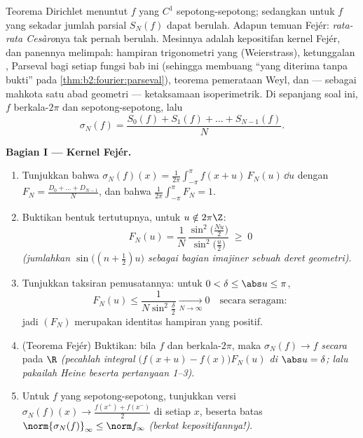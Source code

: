\begin{problem}\label{pb:b2:fourier:1}
Teorema Dirichlet menuntut $f$ yang $C^1$ sepotong-sepotong; sedangkan untuk $f$
yang sekadar  jumlah parsial $S_N(f)$ dapat berulah. Adapun temuan
Fejér: \emph{rata-rata Cesàro}nya tak pernah berulah. Mesinnya adalah
kepositifan kernel Fejér, dan panennya
melimpah: hampiran trigonometri yang  (Weierstrass),
ketunggalan , Parseval bagi setiap fungsi
bab ini (sehingga membuang ``yang diterima tanpa bukti'' pada
\cref{thm:b2:fourier:parseval}), teorema pemerataan Weyl,
dan --- sebagai mahkota satu abad geometri --- 
ketaksamaan isoperimetrik.
Di sepanjang soal ini, $f$ berkala-$2\pi$ dan  sepotong-sepotong,
lalu
\[
\sigma_N(f) = \frac{S_0(f) + S_1(f) + \dots +
S_{N-1}(f)}{N} .
\]

\medskip
\noindent\textbf{Bagian I --- Kernel Fejér.}
\begin{enumerate}
  \item Tunjukkan bahwa $\sigma_N(f)(x) =
        \frac{1}{2\pi}\int_{-\pi}^{\pi}f(x+u)\,F_N(u)\,\dd u$
        dengan $F_N = \frac{D_0 + \dots + D_{N-1}}{N}$, dan
        bahwa $\frac{1}{2\pi}\int_{-\pi}^{\pi}F_N = 1$.
  \item Buktikan bentuk tertutupnya, untuk $u \notin 2\pi\Z$:
        \[
        F_N(u) = \frac{1}{N}\,
        \frac{\sin^2\bigl(\frac{Nu}{2}\bigr)}
        {\sin^2\bigl(\frac u2\bigr)} \;\geq\; 0
        \]
        \emph{(jumlahkan $\sin\bigl((n+\frac12)u\bigr)$ sebagai
        bagian imajiner sebuah deret geometri)}.
  \item Tunjukkan taksiran pemusatannya: untuk $0 < \delta \leq
        \abs u \leq \pi$,
        \[
        F_N(u) \leq \frac{1}{N\sin^2\frac\delta2}
        \xrightarrow[N\to\infty]{} 0
        \quad\text{secara seragam} :
        \]
        jadi $(F_N)$ merupakan identitas hampiran yang positif.
  \item (Teorema Fejér) Buktikan: bila $f$  dan
        berkala-$2\pi$, maka $\sigma_N(f) \to f$
        \emph{secara } pada $\R$ \emph{(pecahlah integral
        $\bigl(f(x+u) - f(x)\bigr)F_N(u)$ di $\abs u =
        \delta$; lalu pakailah Heine beserta pertanyaan 1--3)}.
  \item Untuk $f$ yang  sepotong-sepotong, tunjukkan versi
         $\sigma_N(f)(x) \to \frac{f(x^+) +
        f(x^-)}{2}$ di setiap $x$, beserta batas 
        $\norm{\sigma_N(f)}_\infty \leq \norm f_\infty$
        \emph{(berkat kepositifannya!)}.
\end{enumerate}


\end{problem}
